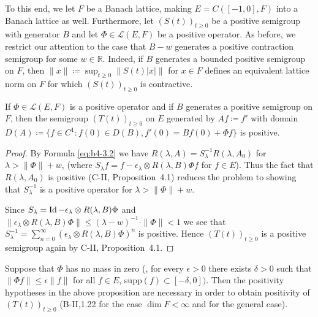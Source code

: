 To this end, we let $F$ be a Banach lattice, making $E = C([-1,0],F)$ into a Banach lattice as well. 
Furthermore, let $(S(t))_{t \geq 0}$ be a positive semigroup with generator $B$ and let $\Phi \in \mathcal{L}(E,F)$ be a positive operator. 
As before, we restrict our attention to the case that $B - w$ generates a positive contraction semigroup for some $w \in \mathbb{R}$. 
Indeed, if $B$ generates a bounded positive semigroup on $F$, then $\|x\|  \coloneq  \sup_{t \geq 0}\|S(t)|x|\|$ for $x \in F$ defines an equivalent lattice norm on $F$ for which $(S(t))_{t \geq 0}$ is contractive.
\begin{proposition}\label{prop:b4-3.5}
	If $\Phi \in \mathcal{L}(E,F)$ is a positive operator and if $B$ generates a positive semigroup on $F$, then the semigroup $(T(t))_{t \geq 0}$ on $E$ generated by $Af  \coloneq  f'$ with domain $D(A)  \coloneq  \{f \in C^1 \colon f(0) \in D(B), f'(0) = Bf(0) + \Phi f\}$ is positive.
\end{proposition}
\begin{proof} By Formula \eqref{eq:b4-3.2} we have $R(\lambda,A) = S_\lambda^{-1}R(\lambda,A_{0})$ for $\lambda > \|\Phi\|+w$, (where $S_\lambda f = f - \epsilon_\lambda \otimes R(\lambda,B)\Phi f$ for $f \in E$). 
Thus the fact that $R(\lambda,A_{0})$ is positive (C-II, Proposition~4.1) reduces the problem to showing that $S_\lambda^{-1}$ is a positive operator for $\lambda > \|\Phi\|+w$.

Since $S_\lambda = \operatorname{Id}  - \epsilon_\lambda \otimes R(\lambda,B)\Phi$ and $\|\epsilon_\lambda \otimes R(\lambda,B)\Phi\| \leq (\lambda-w)^{-1} \cdot \|\Phi\| < 1$ we see that $S_\lambda^{-1} = \sum_{n=0}^{\infty}(\epsilon_\lambda \otimes R(\lambda,B)\Phi)^n$ is positive. 
Hence $(T(t))_{t \geq 0}$ is a positive semigroup again by C-II, Proposition~4.1.
\end{proof}
\begin{remark*}
Suppose that $\Phi$ has no mass in zero (\ie, for every $\epsilon > 0$ there exists $\delta > 0$ such that $\|\Phi f\| \leq \epsilon \|f\|$ for all $f \in E$, supp$(f) \subset [-\delta,0])$. 
Then the positivity hypotheses in the above proposition are necessary in order to obtain positivity of $(T(t))_{t \geq 0}$ (\cf B-II,1.22 for the case $\dim F < \infty$ and \citet{kerscher:1986} for the general case).
\end{remark*}
